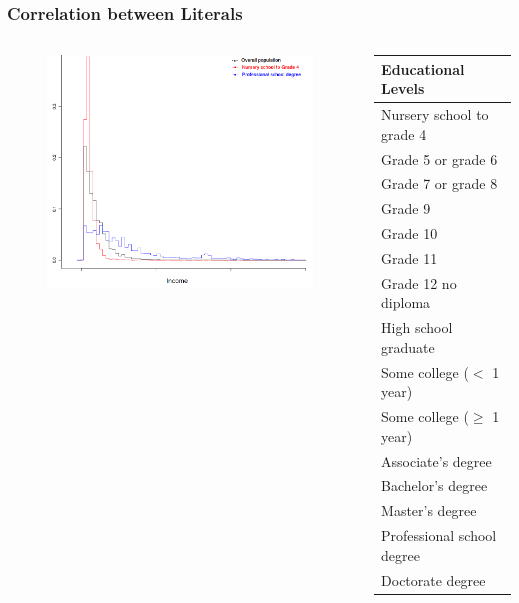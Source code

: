 \documentclass{beamer}
\begin{document}
\begin{frame}
\frametitle{Correlation between Literals}
  \begin{columns}[c]
      \begin{figure}
      \includegraphics[width=0.9\linewidth]{./Figures/prof-nurs.png}
      \end{figure}
	\begin{table}\tiny
	  \begin{tabular}{l}
	    \toprule
	    \textbf{Educational Levels} \\
	    \midrule
	    Nursery school to grade 4 \\
	    Grade 5 or grade 6 \\
	    Grade 7 or grade 8 \\
	    Grade 9	 \\
	    Grade 10 \\
	    Grade 11 \\  
	    Grade 12 no diploma \\
	    High school graduate\\
	    Some college ($<$ 1 year) \\
	    Some college ($\geq$ 1 year) \\
	    Associate's degree \\
	    Bachelor's degree \\
	    Master's degree \\
	    Professional school degree \\
	    Doctorate degree \\
	    \bottomrule	
	\end{tabular}
      \end{table}
  \end{columns}
\end{frame}
\end{document}

